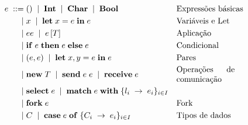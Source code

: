 \begin{figure}
  \begin{align*}
    e \grmeq & \unite \grmor \inte \grmor \chare \grmor \boole && \text{Expressões básicas}\\
    \grmor & \vare{x} \grmor \unlete{x}{e}{e} && \text{Variáveis e Let}\\
    \grmor & \appe{e}{e} \grmor \tappe{e}{T} && \text{Aplicação}\\
    \grmor & \conditionale{e}{e}{e} && \text{Condicional}\\
    \grmor & \paire{e}{e} \grmor \binlete{x}{y}{e}{e} && \text{Pares}\\
    \grmor & \newe{T} \grmor \sende{e}{e} \grmor \recve{e} && \text{\parbox{2.5cm}{Operações de comunicação}}\\
    \grmor & \selecte{e} \grmor \matche{e}{\{l_i\;\to\;e_i\}_{i\in I}} \\
    \grmor & \forke{e}  && \text{Fork}\\
    \grmor & \ctrcte \grmor \casee{e}{\{C_i\;\to\;e_i\}_{i\in I}} && \text{Tipos de dados}
  \end{align*}
\end{figure}


